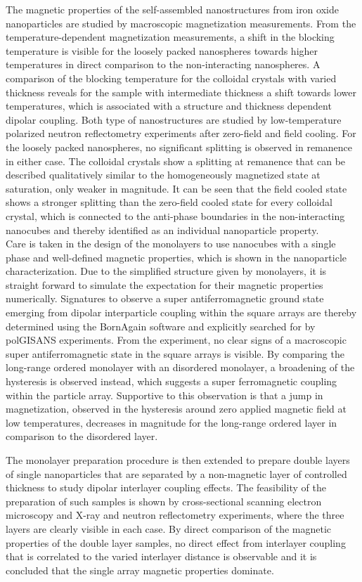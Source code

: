 \documentclass[\main/dresen_thesis.tex]{subfiles}
\begin{document}
  The magnetic properties of the self-assembled nanostructures from iron oxide nanoparticles are studied by macroscopic magnetization measurements.
  From the temperature-dependent magnetization measurements, a shift in the blocking temperature is visible for the loosely packed nanospheres towards higher temperatures in direct comparison to the non-interacting nanospheres.
  A comparison of the blocking temperature for the colloidal crystals with varied thickness reveals for the sample with intermediate thickness a shift towards lower temperatures, which is associated with a structure and thickness dependent dipolar coupling.
  Both type of nanostructures are studied by low-temperature polarized neutron reflectometry experiments after zero-field and field cooling.
  For the loosely packed nanospheres, no significant splitting is observed in remanence in either case.
  The colloidal crystals show a splitting at remanence that can be described qualitatively similar to the homogeneously magnetized state at saturation, only weaker in magnitude.
  It can be seen that the field cooled state shows a stronger splitting than the zero-field cooled state for every colloidal crystal, which is connected to the anti-phase boundaries in the non-interacting nanocubes and thereby identified as an individual nanoparticle property.
  \\

  Care is taken in the design of the monolayers to use nanocubes with a single phase and well-defined magnetic properties, which is shown in the nanoparticle characterization.
  Due to the simplified structure given by monolayers, it is straight forward to simulate the expectation for their magnetic properties numerically.
  Signatures to observe a super antiferromagnetic ground state emerging from dipolar interparticle coupling within the square arrays are thereby determined using the BornAgain software and explicitly searched for by polGISANS experiments.
  From the experiment, no clear signs of a macroscopic super antiferromagnetic state in the square arrays is visible.
  By comparing the long-range ordered monolayer with an disordered monolayer, a broadening of the hysteresis is observed instead, which suggests a super ferromagnetic coupling within the particle array.
  Supportive to this observation is that a jump in magnetization, observed in the hysteresis around zero applied magnetic field at low temperatures, decreases in magnitude for the long-range ordered layer in comparison to the disordered layer.

  The monolayer preparation procedure is then extended to prepare double layers of single nanoparticles that are separated by a non-magnetic layer of controlled thickness to study dipolar interlayer coupling effects.
  The feasibility of the preparation of such samples is shown by cross-sectional scanning electron microscopy and X-ray and neutron reflectometry experiments, where the three layers are clearly visible in each case.
  By direct comparison of the magnetic properties of the double layer samples, no direct effect from interlayer coupling that is correlated to the varied interlayer distance is observable and it is concluded that the single array magnetic properties dominate.
\end{document}
